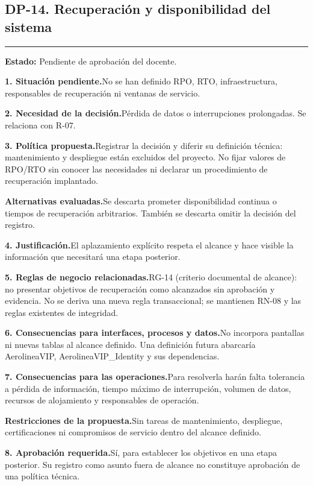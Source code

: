 \documentclass[11pt,a4paper]{article}
\newcommand{\fichacampo}[2]{\noindent\textbf{\color{azulvip}#1}\enspace #2\par\vspace{3pt}}
\begin{document}
\subsection{DP-14. Recuperación y disponibilidad del sistema}
{\color{doradovip}\rule{\textwidth}{.5pt}}
\textbf{Estado:} Pendiente de aprobación del docente.\par\vspace{4pt}
{\normalsize
\fichacampo{1. Situación pendiente.}{No se han definido RPO, RTO, infraestructura, responsables de recuperación ni ventanas de servicio.}
\fichacampo{2. Necesidad de la decisión.}{Pérdida de datos o interrupciones prolongadas. Se relaciona con R-07.}
\fichacampo{3. Política propuesta.}{Registrar la decisión y diferir su definición técnica: mantenimiento y despliegue están excluidos del proyecto. No fijar valores de RPO/RTO sin conocer las necesidades ni declarar un procedimiento de recuperación implantado.}
\fichacampo{Alternativas evaluadas.}{Se descarta prometer disponibilidad continua o tiempos de recuperación arbitrarios. También se descarta omitir la decisión del registro.}
\fichacampo{4. Justificación.}{El aplazamiento explícito respeta el alcance y hace visible la información que necesitará una etapa posterior.}
\fichacampo{5. Reglas de negocio relacionadas.}{RG-14 (criterio documental de alcance): no presentar objetivos de recuperación como alcanzados sin aprobación y evidencia. No se deriva una nueva regla transaccional; se mantienen RN-08 y las reglas existentes de integridad.}
\fichacampo{6. Consecuencias para interfaces, procesos y datos.}{No incorpora pantallas ni nuevas tablas al alcance definido. Una definición futura abarcaría AerolineaVIP, AerolineaVIP\_Identity y sus dependencias.}
\fichacampo{7. Consecuencias para las operaciones.}{Para resolverla harán falta tolerancia a pérdida de información, tiempo máximo de interrupción, volumen de datos, recursos de alojamiento y responsables de operación.}
\fichacampo{Restricciones de la propuesta.}{Sin tareas de mantenimiento, despliegue, certificaciones ni compromisos de servicio dentro del alcance definido.}
\fichacampo{8. Aprobación requerida.}{Sí, para establecer los objetivos en una etapa posterior. Su registro como asunto fuera de alcance no constituye aprobación de una política técnica.}
}
\clearpage
\end{document}
